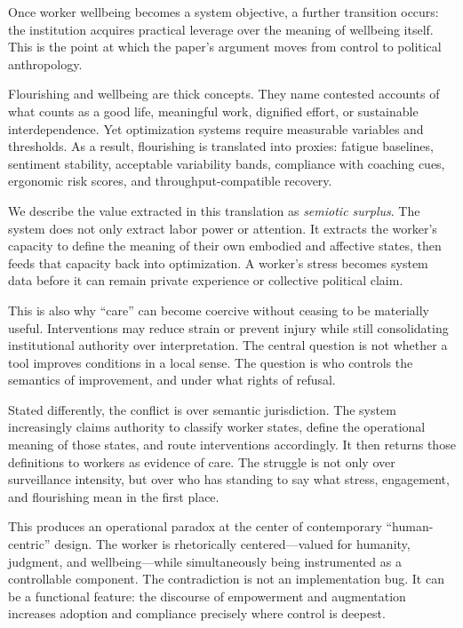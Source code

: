 \documentclass[runningheads]{llncs}
\begin{document}
Once worker wellbeing becomes a system objective, a further transition occurs: the institution acquires practical leverage over the meaning of wellbeing itself. This is the point at which the paper's argument moves from control to political anthropology.

Flourishing and wellbeing are thick concepts. They name contested accounts of what counts as a good life, meaningful work, dignified effort, or sustainable interdependence. Yet optimization systems require measurable variables and thresholds. As a result, flourishing is translated into proxies: fatigue baselines, sentiment stability, acceptable variability bands, compliance with coaching cues, ergonomic risk scores, and throughput-compatible recovery.

We describe the value extracted in this translation as \emph{semiotic surplus}. The system does not only extract labor power or attention. It extracts the worker's capacity to define the meaning of their own embodied and affective states, then feeds that capacity back into optimization. A worker's stress becomes system data before it can remain private experience or collective political claim.

This is also why ``care'' can become coercive without ceasing to be materially useful. Interventions may reduce strain or prevent injury while still consolidating institutional authority over interpretation. The central question is not whether a tool improves conditions in a local sense. The question is who controls the semantics of improvement, and under what rights of refusal.

Stated differently, the conflict is over semantic jurisdiction. The system increasingly claims authority to classify worker states, define the operational meaning of those states, and route interventions accordingly. It then returns those definitions to workers as evidence of care. The struggle is not only over surveillance intensity, but over who has standing to say what stress, engagement, and flourishing mean in the first place.

This produces an operational paradox at the center of contemporary ``human-centric'' design. The worker is rhetorically centered---valued for humanity, judgment, and wellbeing---while simultaneously being instrumented as a controllable component. The contradiction is not an implementation bug. It can be a functional feature: the discourse of empowerment and augmentation increases adoption and compliance precisely where control is deepest.
\end{document}
